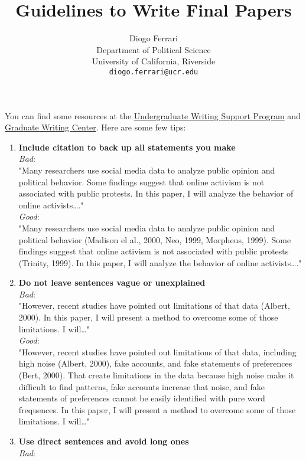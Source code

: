 \documentclass[a4paper]{article}
\author{Diogo Ferrari\\
Department of Political Science\\
University of California, Riverside\\
\texttt{diogo.ferrari@ucr.edu}\\
}
\date{}
\title{Guidelines to Write Final Papers}
\begin{document}
\maketitle
You can find some resources at the \href{https://arc.ucr.edu/writing}{Undergraduate Writing Support Program} and \href{https://gwc.ucr.edu/}{Graduate Writing Center}. Here are some few tips:


\begin{enumerate}
\item \textbf{Include citation to back up all statements you make}\\
\textit{Bad}:\\
"Many researchers use social media data to analyze public opinion and political behavior. Some findings suggest that online activism is not associated with public protests. In this paper, I will analyze the behavior of online activists\ldots{}."\\
\textit{Good}:\\
"Many researchers use social media data to analyze public opinion and political behavior (Madison el al., 2000, Neo, 1999, Morpheus, 1999). Some findings suggest that online activism is not associated with public protests (Trinity, 1999). In this paper, I will analyze the behavior of online activists\ldots{}."
\item \textbf{Do not leave sentences vague or unexplained}\\
\textit{Bad}:\\
"However, recent studies have pointed out limitations of that data (Albert, 2000). In this paper, I will present a method to overcome some of those limitations. I will\ldots{}"\\
\textit{Good}:\\
"However, recent studies have pointed out limitations of that data, including high noise (Albert, 2000), fake accounts, and fake statements of preferences (Bert, 2000). That create limitations in the data because high noise make it difficult to find patterns, fake accounts increase that noise, and fake statements of preferences cannot be easily identified with pure word frequences. In this paper, I will present a method to overcome some of those limitations. I will\ldots{}"\\
\item \textbf{Use direct sentences and avoid long ones}\\
\textit{Bad}:\\

\end{enumerate}
\end{document}

